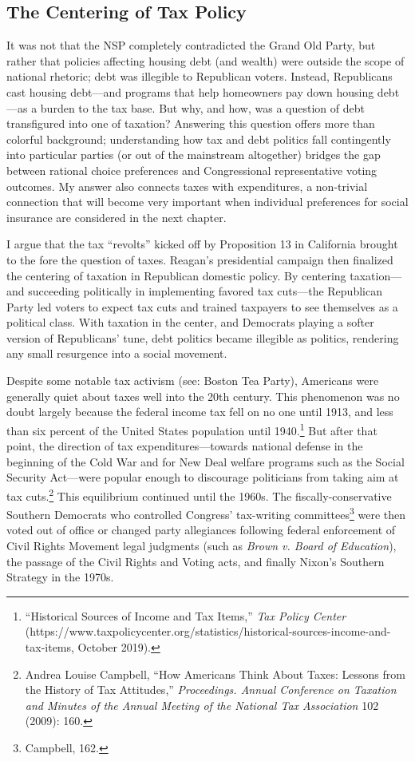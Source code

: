 \documentclass[12pt,oneside]{psthesis}
\begin{document}
\hypertarget{the-centering-of-tax-policy}{%
\subsection{The Centering of Tax Policy}\label{the-centering-of-tax-policy}}

It was not that the NSP completely contradicted the Grand Old Party, but rather that policies affecting housing debt (and wealth) were outside the scope of national rhetoric; debt was illegible to Republican voters.
Instead, Republicans cast housing debt---and programs that help homeowners pay down housing debt---as a burden to the tax base.
But why, and how, was a question of debt transfigured into one of taxation?
Answering this question offers more than colorful background; understanding how tax and debt politics fall contingently into particular parties (or out of the mainstream altogether) bridges the gap between rational choice preferences and Congressional representative voting outcomes.
My answer also connects taxes with expenditures, a non-trivial connection that will become very important when individual preferences for social insurance are considered in the next chapter.

I argue that the tax ``revolts'' kicked off by Proposition 13 in California brought to the fore the question of taxes.
Reagan's presidential campaign then finalized the centering of taxation in Republican domestic policy.
By centering taxation---and succeeding politically in implementing favored tax cuts---the Republican Party led voters to expect tax cuts and trained taxpayers to see themselves as a political class.
With taxation in the center, and Democrats playing a softer version of Republicans' tune, debt politics became illegible as politics, rendering any small resurgence into a social movement.

Despite some notable tax activism (see: Boston Tea Party), Americans were generally quiet about taxes well into the 20th century.
This phenomenon was no doubt largely because the federal income tax fell on no one until 1913, and less than six percent of the United States population until 1940.\footnote{``Historical Sources of Income and Tax Items,'' \emph{Tax Policy Center} (https://www.taxpolicycenter.org/statistics/historical-sources-income-and-tax-items, October 2019).}
But after that point, the direction of tax expenditures---towards national defense in the beginning of the Cold War and for New Deal welfare programs such as the Social Security Act---were popular enough to discourage politicians from taking aim at tax cuts.\footnote{Andrea Louise Campbell, ``How Americans Think About Taxes: Lessons from the History of Tax Attitudes,'' \emph{Proceedings. Annual Conference on Taxation and Minutes of the Annual Meeting of the National Tax Association} 102 (2009): 160.}
This equilibrium continued until the 1960s.
The fiscally-conservative Southern Democrats who controlled Congress' tax-writing committees\footnote{Campbell, 162.} were then voted out of office or changed party allegiances following federal enforcement of Civil Rights Movement legal judgments (such as \emph{Brown v. Board of Education}), the passage of the Civil Rights and Voting acts, and finally Nixon's Southern Strategy in the 1970s.
\end{document}
